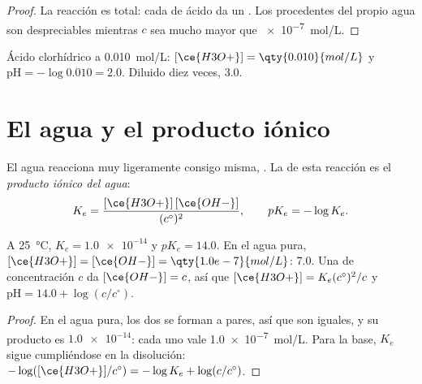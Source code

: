 \begin{proof}
La reacción  es total: cada  de ácido
da un . Los  procedentes del propio agua son despreciables
mientras $c$ sea mucho mayor que \qty{e-7}{mol/L}.
\end{proof}

\begin{example}\label{ex:g12:ka-and-pka:hcl}
Ácido clorhídrico a \qty{0.010}{mol/L}: $[\ce{H3O+}] = \qty{0.010}{mol/L}$
y $\mathrm{pH} = -\log 0.010 = 2.0$. Diluido diez veces,  3.0.
\end{example}

\section{El agua y el producto iónico}


\begin{definition}\label{def:g12:ka-and-pka:ionic-product}
El agua reacciona muy ligeramente consigo misma, .
La  de esta reacción es el \emph{producto iónico
del agua}:
\[
  K_e = \frac{[\ce{H3O+}]\,[\ce{OH-}]}{(c^\circ)^2},
  \qquad pK_e = -\log K_e .
\]
\end{definition}

\begin{proposition}\label{prop:g12:ka-and-pka:ke}
A \qty{25}{\celsius}, $K_e = \num{1.0e-14}$ y $pK_e = 14.0$. En el agua
pura, $[\ce{H3O+}] = [\ce{OH-}] = \qty{1.0e-7}{mol/L}$:  7.0. Una  de concentración $c$ da $[\ce{OH-}] = c$, así que
$[\ce{H3O+}] = K_e (c^\circ)^2 / c$ y $\mathrm{pH} = 14.0 + \log(c/c^\circ)$.
\end{proposition}

\begin{proof}
En el agua pura, los dos  se forman a pares, así que son iguales, y
su producto es $\num{1.0e-14}$: cada uno vale \qty{1.0e-7}{mol/L}. Para
la base, $K_e$ sigue cumpliéndose en la disolución:
$-\log([\ce{H3O+}]/c^\circ) = -\log K_e + \log(c/c^\circ)$.
\end{proof}

